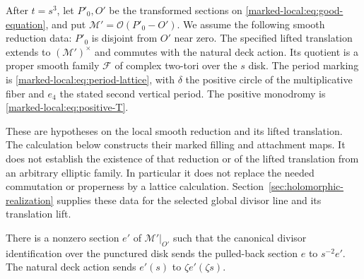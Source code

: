 After $t=s^3$, let $P'_0,O'$ be the transformed sections on
\eqref{marked-local:eq:good-equation}, and put
$\mathcal M'=\mathcal O(P'_0-O')$. We assume the following smooth
reduction data: $P'_0$ is disjoint from $O'$ near zero. The specified
lifted translation extends to $(\mathcal M')^\times$ and commutes
with the natural deck action. Its quotient is a proper smooth
family $\mathcal F$ of complex two-tori over the $s$ disk. The
period marking is \eqref{marked-local:eq:period-lattice}, with $\delta$ the
positive circle of the multiplicative fiber and $e_4$ the stated
second vertical period. The positive monodromy is
\eqref{marked-local:eq:positive-T}.

These are hypotheses on the local smooth reduction and its lifted
translation. The calculation below constructs their marked filling
and attachment maps. It does not establish the existence of that
reduction or of the lifted translation from an arbitrary elliptic
family. In particular it does not replace the needed commutation
or properness by a lattice calculation.
Section~\ref{sec:holomorphic-realization} supplies these data for
the selected global divisor line and its translation lift.

\begin{lemma}\label{marked-local:lem:conormal-comparison}
There is a nonzero section $e'$ of $\mathcal M'|_{O'}$ such that
the canonical divisor identification over the punctured disk sends
the pulled-back section $e$ to $s^{-2}e'$. The natural deck action
sends $e'(s)$ to $\zeta e'(\zeta s)$.
\end{lemma}

